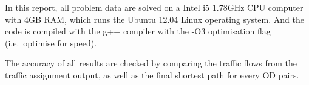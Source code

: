 In this report, all problem data are solved on a Intel i5 1.78GHz CPU computer with 4GB RAM, which runs the Ubuntu 12.04 Linux operating system.
And the code is compiled with the g++ compiler with the -O3 optimisation flag (i.e.\ optimise for speed).

The accuracy of all results are checked by comparing the traffic flows from the traffic assignment output,
as well as the final shortest path for every OD pairs.  

